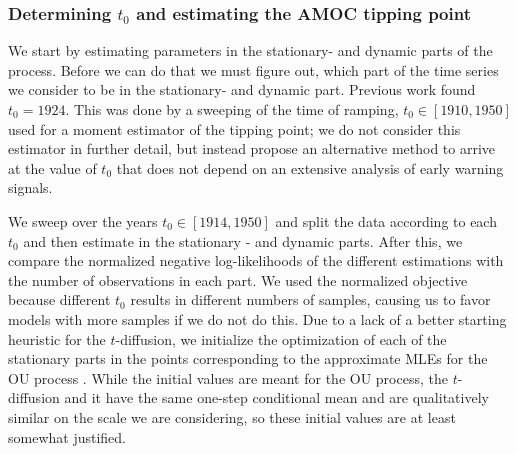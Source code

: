 \subsubsection{Determining \texorpdfstring{$t_0$}{t0} and estimating the AMOC tipping point}
We start by estimating parameters in the stationary- and dynamic parts of the process. Before we can do that we must figure out, which part of the time series we consider to be in the stationary- and dynamic part. Previous work found $t_0 = 1924$. This was done by a sweeping of the time of ramping, $t_0 \in [1910, 1950]$ used for a moment estimator of the tipping point; we do not consider this estimator in further detail, but instead propose an alternative method to arrive at the value of $t_0$ that does not depend on an extensive analysis of early warning signals. 

We sweep over the years $t_0 \in [1914, 1950]$ and split the data according to each $t_0$ and then estimate in the stationary - and dynamic parts. After this, we compare the normalized negative log-likelihoods of the different estimations with the number of observations in each part. We used the normalized objective because different $t_0$ results in different numbers of samples, causing us to favor models with more samples if we do not do this. Due to a lack of a better starting heuristic for the $t$-diffusion, we initialize the optimization of each of the stationary parts in the points corresponding to the approximate MLEs for the OU process \cite[equation (S4-S6)]{DitlevsenSupplementary}. While the initial values are meant for the OU process, the $t$-diffusion and it have the same one-step conditional mean and are qualitatively similar on the scale we are considering, so these initial values are at least somewhat justified.

